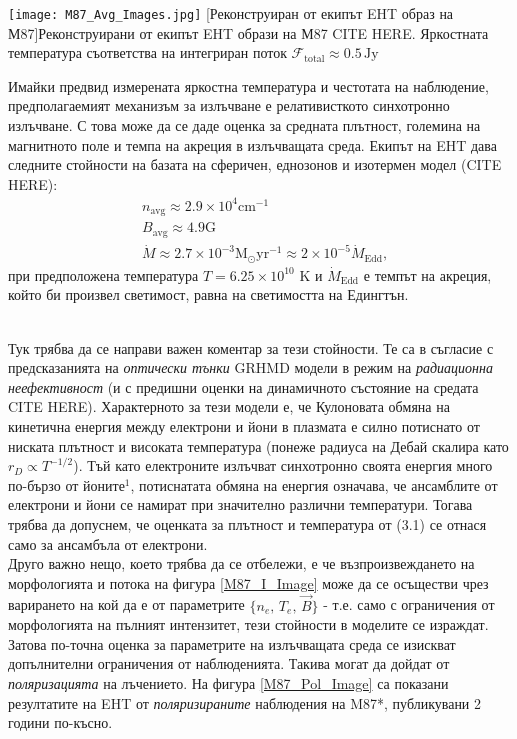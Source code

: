 \begin{minipage}{15em}
	\centering
	\texttt{[image: М87\_Avg\_Images.jpg]}
	[Реконструиран от екипът EHT образ на М87]{\small Реконструирани от екипът EHT образи на М87 CITE HERE. Яркостната температура съответства на интегриран поток $\mathcal{F}_{\text{total}}\approx0.5\,\text{Jy}$}
	\label{M87_I_Image}
\end{minipage}
\begin{minipage}{16em}
	Имайки предвид измерената яркостна температура и честотата на наблюдение, предполагаемият механизъм за излъчване е релативисткото синхотронно излъчване. С това може да се даде оценка за средната плътност, големина на магнитното поле и темпа на акреция в излъчващата среда. Екипът на EHT дава следните стойности на базата на сферичен, еднозонов и изотермен модел (CITE HERE):
	\begin{equation}
		\begin{aligned}
			&n_{\text{avg}} \approx 2.9\times 10^{4} \text{cm}^{-1}\\
			&B_{\text{avg}} \approx 4.9 \text{G}\\
			&\dot{M} \approx 2.7\times 10^{-3} \text{M}_\odot \text{yr}^{-1} \approx 2 \times 10^{-5} \dot{M}_{\text{Edd}},
		\end{aligned}
	\end{equation}
	при предположена температура $T = 6.25\times 10^{10}$ K и $\dot{M}_{\text{Edd}}$ е темпът на акреция, който би произвел светимост, равна на светимостта на Едингтън. 
\end{minipage}\\
\newpage
Тук трябва да се направи важен коментар за тези стойности. Те са в съгласие с предсказанията на \emph{оптически тънки} GRHMD модели в режим на \emph{радиационна неефективност} (и с предишни оценки на динамичното състояние на средата CITE HERE). Характерното за тези модели е, че Кулоновата обмяна на кинетична енергия между електрони и йони в плазмата е силно потиснато от ниската плътност и високата температура (понеже радиуса на Дебай скалира като $r_D \propto T^{-1/2}$). Тъй като електроните излъчват синхотронно своята енергия много по-бързо от йоните$^1$, потиснатата обмяна на енергия означава, че ансамблите от електрони и йони се намират при значително различни температури. Тогава трябва да допуснем, че оценката за плътност и температура от (3.1) се отнася само за ансамбъла от електрони.\\

Друго важно нещо, което трябва да се отбележи, е че възпроизвеждането на морфологията и потока на фигура \ref{M87_I_Image} може да се осъществи чрез варирането на кой да е от параметрите $\{n_{e},\,T_{e},\, \vec{B}\}$ - т.е. само с ограничения от морфологията на пълният интензитет, тези стойности в моделите се израждат. Затова по-точна оценка за параметрите на излъчващата среда се изискват допълнителни ограничения от наблюденията. Такива могат да дойдат от \emph{поляризацията} на лъчението. На фигура \ref{M87_Pol_Image} са показани резултатите на EHT от \emph{поляризираните} наблюдения на M87*, публикувани 2 години по-късно.\\

